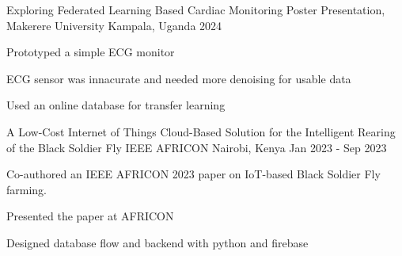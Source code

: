 
\begin{cventries}

    \cventry
        {Exploring Federated Learning Based Cardiac Monitoring}
        {Poster Presentation, Makerere University}
        {Kampala, Uganda}
        {2024}
        {
          \begin{cvitems}
            \item Prototyped a simple ECG monitor
            \item ECG sensor was innacurate and needed more denoising for usable data
            \item Used an online database for transfer learning
          \end{cvitems}
        }   
    
    \cventry
        {A Low-Cost Internet of Things Cloud-Based Solution for the Intelligent Rearing of the Black Soldier Fly}
        {IEEE AFRICON}
        {Nairobi, Kenya}
        {Jan 2023 - Sep 2023}
        {
          \begin{cvitems}
            \item Co-authored an IEEE AFRICON 2023 paper on IoT-based Black Soldier Fly farming.
            \item Presented the paper at AFRICON
            \item Designed database flow and backend with python and firebase
          \end{cvitems}
        }     
    
\end{cventries}
